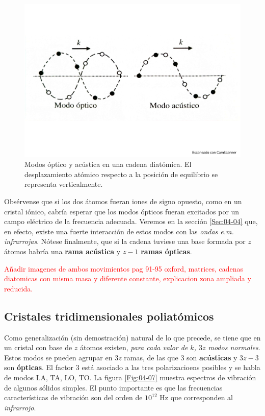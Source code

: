 \begin{figure}[h!] \centering
    \includegraphics[scale=0.37]{Cuerpo/Ch_04/Fotos libro 6.pdf}
    \caption{Modos óptico y acústica en una cadena diatómica. El desplazamiento atómico respecto a la posición de equilibrio se representa verticalmente.}
    \label{Fig:04-06}
\end{figure}    

Obsérvense que si los dos átomos fueran iones de signo opuesto, como en un cristal iónico, cabría esperar que los modos ópticos fueran excitados por un campo eléctrico de la frecuencia adecuada. Veremos en la sección \ref{Sec:04-04} que, en efecto, existe una fuerte interacción de estos modos con las \textit{ondas e.m. infrarrojas}. Nótese finalmente, que si la cadena tuviese una base formada por $z$ átomos habría una \textbf{rama acústica} y $z-1$ \textbf{ramas ópticas}.

\begin{Anotacion}
	\textcolor{red}{Añadir imagenes de ambos movimientos pag 91-95 oxford, matrices, cadenas diatomicas con misma masa y diferente constante, explicacion zona ampliada y reducida.}
\end{Anotacion}	

\subsection{Cristales tridimensionales poliatómicos}

Como generalización (sin demostración) natural de lo que precede, se tiene que en un cristal con base de $z$ átomos existen, \textit{para cada valor de $k$, $3z$ modos normales}. Estos modos se pueden agrupar en $3z$ ramas, de las que $3$ son \textbf{acústicas} y $3z-3$ son \textbf{ópticas}. El factor 3 está asociado a las tres polarizacioens posibles y se habla de modos LA, TA, LO, TO. La figura \ref{Fig:04-07} muestra espectros de vibración de algunos sólidos simples. El punto importante es que las frecuencias características de vibración son del orden de $10^{12}$ Hz que corresponden al \textit{infrarrojo}.

